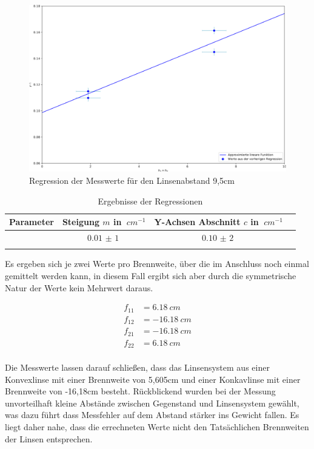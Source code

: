 \begin{figure}[h!]{}
    \begin{center}
        \includegraphics[scale=0.4]{./fig/Abbe_h1h2_Plot.pdf}
        \caption{Regression der Messwerte für den Linsenabstand 9,5cm}
        \label{fig:Abbe-Regress-h1h2}
    \end{center}
\end{figure}

\begin{table}[h!]
    \begin{center}
        \caption{Ergebnisse der Regressionen}
        \begin{tabular}{cccc}
            \hline
            Parameter & Steigung $m$ in $\SI{}{cm^{-1}}$   & Y-Achsen Abschnitt $c$ in $\SI{}{cm^{-1}}$\\
            \hline
                     & $\SI{0,01(1)}{}$   & $\SI{0,10(2)}{}$ \\
            \hline
            \label{tab:abbe-Regression-results}
        \end{tabular}
    \end{center}
\end{table}

Es ergeben sich je zwei Werte pro Brennweite, über die im Anschluss noch einmal gemittelt werden kann, in diesem Fall ergibt sich aber durch die symmetrische Natur der Werte kein Mehrwert daraus.


\begin{align}
    f_{11} &= \SI{6,18}{cm} \\
    f_{12} &= \SI{-16,18}{cm} \\
    f_{21} &= \SI{-16,18}{cm} \\
    f_{22} &= \SI{6,18}{cm} \\
\end{align}

Die Messwerte lassen darauf schließen, dass das Linsensystem aus einer Konvexlinse mit einer Brennweite von 5,605cm und einer Konkavlinse mit einer Brennweite von -16,18cm besteht.
Rückblickend wurden bei der Messung unvorteilhaft kleine Abstände zwischen Gegenstand und Linsensystem gewählt, was dazu führt dass Messfehler auf dem Abstand stärker ins Gewicht fallen.
Es liegt daher nahe, dass die errechneten Werte nicht den Tatsächlichen Brennweiten der Linsen entsprechen.